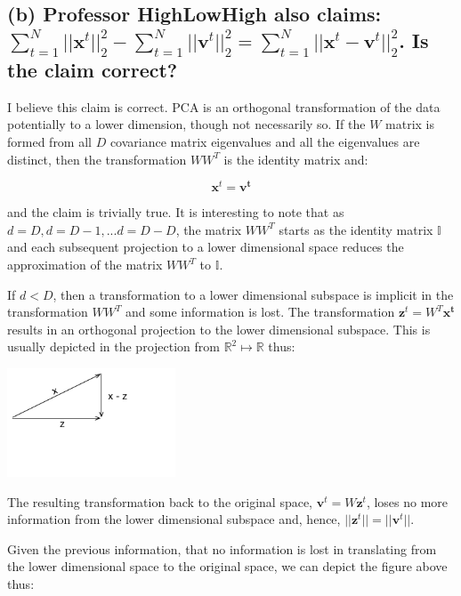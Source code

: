 \documentclass{article}
\begin{document}
\subsection{(b) Professor HighLowHigh also claims: $\sum\limits_{t=1}^N || \mathbf{x}^t ||_2^2 - \sum\limits_{t=1}^N || \mathbf{v}^t ||_2^2 = \sum\limits_{t=1}^N || \mathbf{x}^t - \mathbf{v}^t ||_2^2$.   Is the claim correct?}

I believe this claim is correct.  PCA is an orthogonal transformation of the data potentially to a lower dimension, though not necessarily so.  If the $W$ matrix is formed from all $D$ covariance matrix eigenvalues and all the eigenvalues are distinct, then the transformation $WW^T$ is the identity matrix and:

\begin{equation}
\mathbf{x}^t = \mathbf{v^t}
\end{equation}

and the claim is trivially true.  It is interesting to note that as $d = D, d = D-1, ... d = D-D$, the matrix $WW^T$ starts as the identity matrix $\mathbb{I}$ and each subsequent projection to a lower dimensional space reduces the approximation of the matrix  $WW^T$ to $\mathbb{I}$.

If $d < D$, then a transformation to a lower dimensional subspace is implicit in the transformation $WW^T$ and some information is lost.  The transformation $\mathbf{z}^t = W^T \mathbf{x^t}$ results in an orthogonal projection to the lower dimensional subspace.  This is usually depicted in the projection from $\mathbb{R}^2 \mapsto \mathbb{R}$ thus:

\begin{center}
  \includegraphics[width=50mm, scale=0.5]{x-minus-z.png}
\end{center}

The resulting transformation back to the original space, $\mathbf{v}^t = W\mathbf{z}^t$, loses no more information from the lower dimensional subspace and, hence, $|| \mathbf{z}^t || =|| \mathbf{v}^t ||$.

Given the previous information, that no information is lost in translating from the lower dimensional space to the original space, we can depict the figure above thus:
\end{document}
